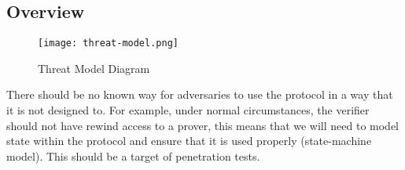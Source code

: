 \subsection{Overview}

\begin{figure}[h]
    \centering
    \texttt{[image: threat-model.png]}
    \caption{Threat Model Diagram}
    \label{fig:threat_model}
\end{figure}

There should be no known way for adversaries to use the protocol in a way that it is not designed to. For example, under normal circumstances, the verifier should not have rewind access to a prover, this means that we will need to model state within the protocol and ensure that it is used properly (state-machine model). This should be a target of penetration tests. 



